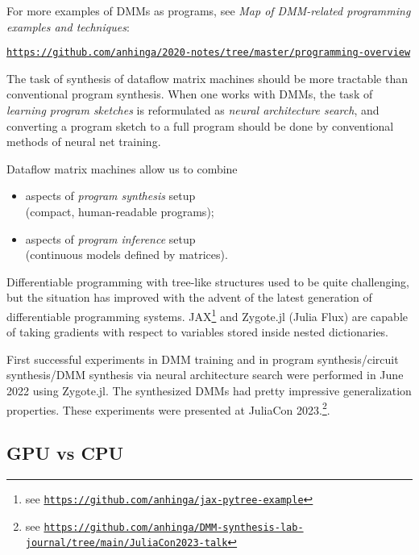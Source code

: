 \documentclass{article}
\begin{document}
For more examples of DMMs as programs, see {\em Map of DMM-related programming examples and techniques}: 

\hspace{0.3in}\href{https://github.com/anhinga/2020-notes/tree/master/programming-overview}{\tt https://github.com/anhinga/2020-notes/tree/master/programming-overview}


\pagebreak

The task of synthesis of dataflow matrix machines
should be more tractable than conventional program synthesis. When one works with DMMs, the task of
{\em learning program sketches} is reformulated as {\em neural architecture search},
and converting a program sketch to a full program should be done by
conventional methods of neural net training. 

\vspace{0.1in}
\noindent
Dataflow matrix machines allow us  to combine

  \begin{itemize}
      \item aspects of {\em program synthesis} setup\\ (compact, human-readable programs);
      \item aspects of {\em program inference} setup\\ (continuous models defined by matrices).
  \end{itemize}

Differentiable programming with tree-like structures used to be quite challenging, but the situation
has improved with the advent of the latest generation of differentiable programming systems.
JAX\footnote{see \href{https://github.com/anhinga/jax-pytree-example}{\tt https://github.com/anhinga/jax-pytree-example}} and Zygote.jl (Julia Flux) are capable of taking gradients with respect to variables stored inside 
nested dictionaries.

First successful experiments in DMM training and in program synthesis/circuit synthesis/DMM synthesis via neural architecture search
were performed in June 2022 using Zygote.jl. The synthesized DMMs had pretty impressive generalization properties.
These experiments were presented at JuliaCon 2023.\footnote{see 
\href{https://github.com/anhinga/DMM-synthesis-lab-journal/tree/main/JuliaCon2023-talk}{\tt https://github.com/anhinga/DMM-synthesis-lab-journal/tree/main/JuliaCon2023-talk}}.

\subsection{GPU vs CPU}
\end{document}
